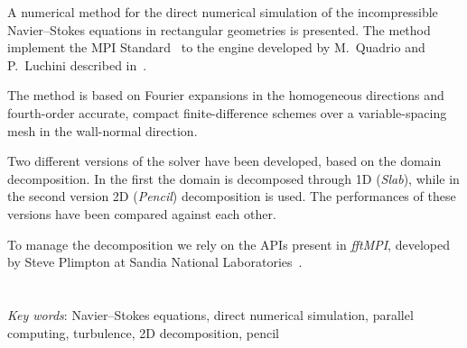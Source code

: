 \documentclass[a4paper,twosides,openright,titlepage]{book}
\newenvironment{abstract}%
	{\cleardoublepage%
		\thispagestyle{empty}%
		\null \vfill\begin{center}%
		\bfseries \abstractname \end{center}}%
	{\vfill\null}
\begin{document}
\begin{abstract}
\hrulefill

A numerical method for the direct numerical simulation of the incompressible Navier–Stokes equations in rectangular geometries is presented. The method implement the MPI Standard~\cite{MPI} to the engine developed by M.~Quadrio and P.~Luchini described in~\cite{cpl:presentazione}. 

The method is based on Fourier expansions in the homogeneous directions and fourth-order accurate, compact finite-difference schemes over a variable-spacing mesh in the wall-normal direction. 

Two different versions of the solver have been developed, based on the domain decomposition.  In the first the domain is decomposed through 1D (\emph{Slab}), while in the second version 2D (\emph{Pencil}) decomposition is used.
The performances of these versions have been compared against each other.

To manage the decomposition we rely on the APIs present in \emph{fftMPI}, developed by Steve Plimpton at Sandia National Laboratories~\cite{fftMPI}.
\\
\\
\\
\emph{Key words}: Navier–Stokes equations, direct numerical simulation, parallel computing, turbulence, 2D decomposition, pencil 

\hrulefill
\end{abstract}
\end{document}
